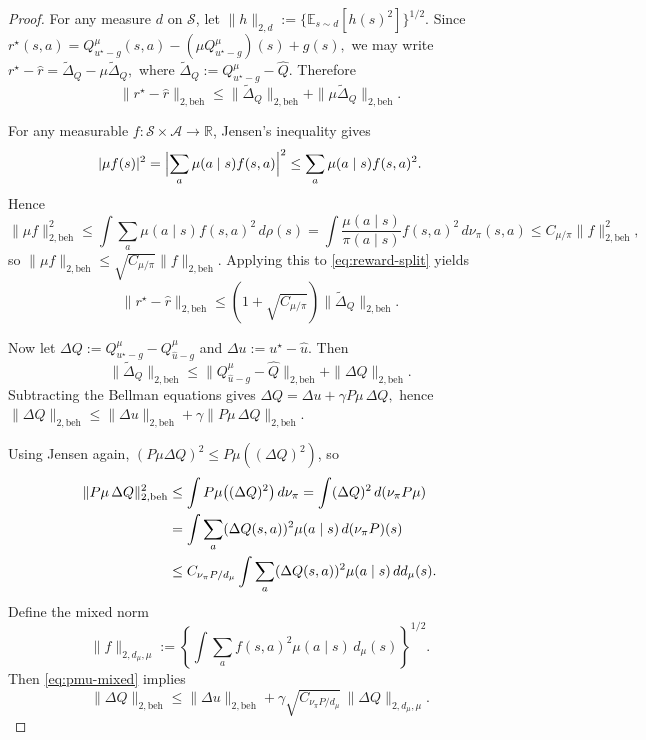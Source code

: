 \documentclass{article}
\newcommand{\E}{\mathbb{E}}
\newcommand{\1}{\mathbbm{1}}
\begin{document}
\begin{proof}
For any measure \(d\) on \(\mathcal S\), let
\(
\|h\|_{2,d} := \{\E_{s\sim d}[h(s)^2]\}^{1/2}.
\)
Since
\(
r^\star(s,a)=Q^\mu_{u^\star-g}(s,a)-(\mu Q^\mu_{u^\star-g})(s)+g(s),
\)
we may write
\(
r^\star-\hat r=\widetilde\Delta_Q-\mu\widetilde\Delta_Q,
\)
where
\(
\widetilde\Delta_Q:=Q^\mu_{u^\star-g}-\hat Q.
\)
Therefore
\begin{equation}
\label{eq:reward-split}
\|r^\star-\hat r\|_{2,\mathrm{beh}}
\le
\|\widetilde\Delta_Q\|_{2,\mathrm{beh}}
+
\|\mu\widetilde\Delta_Q\|_{2,\mathrm{beh}}.
\end{equation}

For any measurable \(f:\mathcal S\times\mathcal A\to\mathbb R\), Jensen's inequality gives
\[
|\mu f(s)|^2
=
\Bigl|\sum_a \mu(a\mid s)f(s,a)\Bigr|^2
\le
\sum_a \mu(a\mid s)f(s,a)^2.
\]
Hence
\[
\|\mu f\|_{2,\mathrm{beh}}^2
\le
\int \sum_a \mu(a\mid s)f(s,a)^2\,d\rho(s)
=
\int \frac{\mu(a\mid s)}{\pi(a\mid s)}f(s,a)^2\,d\nu_\pi(s,a)
\le
C_{\mu/\pi}\|f\|_{2,\mathrm{beh}}^2,
\]
so
\(
\|\mu f\|_{2,\mathrm{beh}}
\le
\sqrt{C_{\mu/\pi}}\|f\|_{2,\mathrm{beh}}.
\)
Applying this to \eqref{eq:reward-split} yields
\begin{equation}
\label{eq:reward-to-Q}
\|r^\star-\hat r\|_{2,\mathrm{beh}}
\le
(1+\sqrt{C_{\mu/\pi}})\|\widetilde\Delta_Q\|_{2,\mathrm{beh}}.
\end{equation}

Now let
\(
\Delta Q:=Q^\mu_{u^\star-g}-Q^\mu_{\hat u-g}
\)
and
\(
\Delta u:=u^\star-\hat u.
\)
Then
\begin{equation}
\label{eq:Q-triangle}
\|\widetilde\Delta_Q\|_{2,\mathrm{beh}}
\le
\|Q^\mu_{\hat u-g}-\hat Q\|_{2,\mathrm{beh}}
+
\|\Delta Q\|_{2,\mathrm{beh}}.
\end{equation}
Subtracting the Bellman equations gives
\(
\Delta Q=\Delta u+\gamma P\mu\,\Delta Q,
\)
hence
\(
\|\Delta Q\|_{2,\mathrm{beh}}
\le
\|\Delta u\|_{2,\mathrm{beh}}+\gamma\|P\mu\,\Delta Q\|_{2,\mathrm{beh}}.
\)

Using Jensen again, \((P\mu \Delta Q)^2 \le P\mu((\Delta Q)^2)\), so
\begin{align}
\|P\mu\,\Delta Q\|_{2,\mathrm{beh}}^2
&\le
\int P\mu\bigl((\Delta Q)^2\bigr)\,d\nu_\pi
=
\int (\Delta Q)^2\,d(\nu_\pi P\mu) \notag\\
&=
\int \sum_a (\Delta Q(s,a))^2\mu(a\mid s)\,d(\nu_\pi P)(s) \notag\\
&\le
C_{\nu_\pi P/d_\mu}
\int \sum_a (\Delta Q(s,a))^2\mu(a\mid s)\,dd_\mu(s).
\label{eq:pmu-mixed}
\end{align}
Define the mixed norm
\[
\|f\|_{2,d_\mu,\mu}
:=
\left\{
\int \sum_a f(s,a)^2\mu(a\mid s)\,d_\mu(s)
\right\}^{1/2}.
\]
Then \eqref{eq:pmu-mixed} implies
\begin{equation}
\label{eq:DeltaQ-beh}
\|\Delta Q\|_{2,\mathrm{beh}}
\le
\|\Delta u\|_{2,\mathrm{beh}}
+
\gamma\sqrt{C_{\nu_\pi P/d_\mu}}\,
\|\Delta Q\|_{2,d_\mu,\mu}.
\end{equation}


\end{proof}
\end{document}
